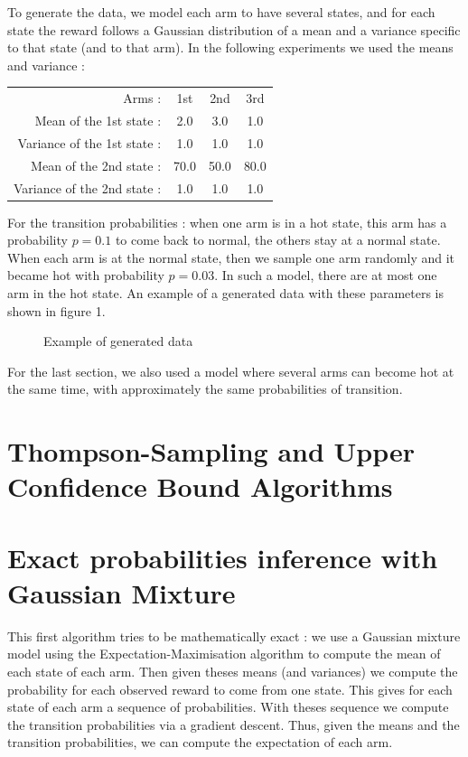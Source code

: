 \documentclass{article} %
\begin{document}
To generate the data, we model each arm to have several states, and for each state the reward follows a Gaussian distribution of a mean and a variance specific to that state (and to that arm). In the following experiments we used the means and variance :
\begin{center}
\begin{tabular}{rccc}
	Arms : & 1st & 2nd & 3rd \\
	Mean of the 1st state : & 2.0 & 3.0 & 1.0 \\
	Variance of the 1st state : & 1.0 & 1.0 & 1.0 \\
	Mean of the 2nd state : & 70.0 & 50.0 & 80.0 \\
	Variance of the 2nd state : & 1.0 & 1.0 & 1.0 \\
\end{tabular}
\end{center}
For the transition probabilities : when one arm is in a hot state, this arm has a probability $p=0.1$ to come back to normal, the others stay at a normal state. When each arm is at the normal state, then we sample one arm randomly and it became hot with probability $p=0.03$. In such a model, there are at most one arm in the hot state. An example of a generated data with these parameters is shown in figure 1.
\newline

\begin{figure}[h]
	\begin{center}
	\end{center}
	\caption{Example of generated data}
\end{figure}

For the last section, we also used a model where several arms can become hot at the same time, with approximately the same probabilities of transition.

\section{Thompson-Sampling and Upper Confidence Bound Algorithms}

\section{Exact probabilities inference with Gaussian Mixture}

This first algorithm tries to be mathematically exact : we use a Gaussian mixture model using the Expectation-Maximisation algorithm to compute the mean of each state of each arm. Then given theses means (and variances) we compute the probability for each observed reward to come from one state. This gives for each state of each arm a sequence of probabilities. With theses sequence we compute the transition probabilities via a gradient descent. Thus, given the means and the transition probabilities, we can compute the expectation of each arm.
\newline
\end{document}
